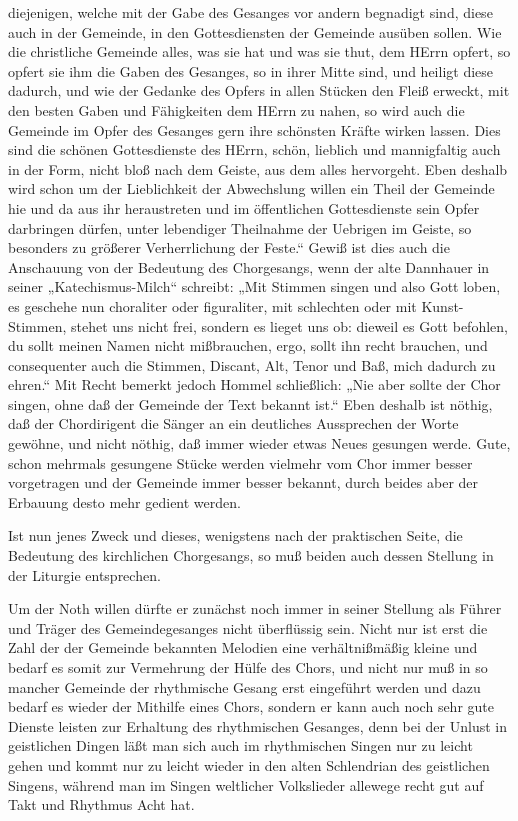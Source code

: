 diejenigen, welche mit der Gabe des Gesanges vor andern begnadigt sind, diese auch in der Gemeinde, in den Gottesdiensten der Gemeinde ausüben sollen. Wie die christliche Gemeinde alles, was sie hat und was sie thut, dem HErrn opfert, so opfert sie ihm die Gaben des Gesanges, so in ihrer Mitte sind, und heiligt diese dadurch, und wie der Gedanke des Opfers in allen Stücken den Fleiß erweckt, mit den besten Gaben und Fähigkeiten dem HErrn zu nahen, so wird auch die Gemeinde im Opfer des Gesanges gern ihre schönsten Kräfte wirken lassen. Dies sind die schönen Gottesdienste des HErrn, schön, lieblich und mannigfaltig auch in der Form, nicht bloß nach dem Geiste, aus dem alles hervorgeht. Eben deshalb wird schon um der Lieblichkeit der Abwechslung willen ein Theil der Gemeinde hie und da aus ihr heraustreten und im öffentlichen Gottesdienste sein Opfer darbringen dürfen, unter lebendiger Theilnahme der Uebrigen im Geiste, so besonders zu größerer Verherrlichung der Feste.“ Gewiß ist dies auch die Anschauung von der Bedeutung des Chorgesangs, wenn der alte Dannhauer in seiner „Katechismus-Milch“ schreibt: „Mit Stimmen singen und also Gott loben, es geschehe nun choraliter oder figuraliter, mit schlechten oder mit Kunst-Stimmen, stehet uns nicht frei, sondern es lieget uns ob: dieweil es Gott befohlen, du sollt meinen Namen nicht mißbrauchen, ergo, sollt ihn recht brauchen, und consequenter auch die Stimmen, Discant, Alt, Tenor und Baß, mich dadurch zu ehren.“ Mit Recht bemerkt jedoch Hommel schließlich: „Nie aber sollte der Chor singen, ohne daß der Gemeinde der Text bekannt ist.“ Eben deshalb ist nöthig, daß der Chordirigent die Sänger an ein deutliches Aussprechen der Worte gewöhne, und nicht nöthig, daß immer wieder etwas Neues gesungen werde. Gute, schon mehrmals gesungene Stücke werden vielmehr vom Chor immer besser vorgetragen und der Gemeinde immer besser bekannt, durch beides aber der Erbauung desto mehr gedient werden.

Ist nun jenes Zweck und dieses, wenigstens nach der praktischen Seite, die Bedeutung des kirchlichen Chorgesangs, so muß beiden auch dessen Stellung in der Liturgie entsprechen.

Um der Noth willen dürfte er zunächst noch immer in seiner Stellung als Führer und Träger des Gemeindegesanges nicht überflüssig sein. Nicht nur ist erst die Zahl der der Gemeinde bekannten Melodien eine verhältnißmäßig kleine und bedarf es somit zur Vermehrung der Hülfe des Chors, und nicht nur muß in so mancher Gemeinde der rhythmische Gesang erst eingeführt
werden und dazu bedarf es wieder der Mithilfe eines Chors, sondern er kann auch noch sehr gute Dienste leisten zur Erhaltung des rhythmischen Gesanges, denn bei der Unlust in geistlichen Dingen läßt man sich auch im rhythmischen Singen nur zu leicht gehen und kommt nur zu leicht wieder in den alten Schlendrian des geistlichen Singens, während man im Singen weltlicher Volkslieder allewege recht gut auf Takt und Rhythmus Acht hat.

